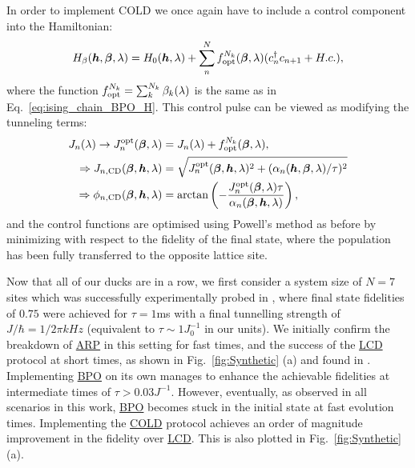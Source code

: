 \documentclass[a4paper,oneside,11pt]{book}
\newcommand{\betabb}{\boldsymbol{\beta}}
\newcommand{\hbb}{\boldsymbol{h}}
\newcommand{\acrref}[1]{\hyperref[acr:#1]{#1}}
\begin{document}
In order to implement COLD we once again have to include a control component into the Hamiltonian:
\begin{equation}\label{eq:ising_control_nocrab}
    \begin{aligned}
        H_{\beta}(\hbb, \betabb, \lambda) = H_0(\hbb, \lambda) + \sum_n^N f_{\rm opt}^{N_k}(\betabb, \lambda) (c_n^{\dag}c_{n+1} + H.c.),
    \end{aligned}
\end{equation}
where the function $f_{\rm opt}^{N_k} = \sum_k^{N_k} \beta_k(\lambda)$ is the same as in Eq.~\eqref{eq:ising_chain_BPO_H}. This control pulse can be viewed as modifying the tunneling terms:
\begin{equation}\label{eq:synthetic_control_funcs}
    \begin{aligned}
        J_n(\lambda) \rightarrow J_n^{\rm opt}(\betabb, \lambda) &= J_n(\lambda) + f_{\rm opt}^{N_k}(\betabb, \lambda), \\
        \Rightarrow J_{n, \rm CD}(\betabb, \hbb, \lambda) &= \sqrt{J_n^{\rm opt}(\betabb,\hbb, \lambda)^2 + (\alpha_n(\hbb, \betabb, \lambda)/\tau)^2} \\
        \Rightarrow \phi_{n, \mathrm{CD}}(\betabb, \hbb, \lambda) &= \arctan\left(-\frac{J_n^{\rm opt}(\betabb, \lambda)\tau}{\alpha_n(\betabb, \hbb, \lambda)}\right),
    \end{aligned}
\end{equation} 
and the control functions are optimised using Powell's method as before by minimizing with respect to the fidelity of the final state, where the population has been fully transferred to the opposite lattice site. 

Now that all of our ducks are in a row, we first consider a system size of $N=7$ sites which was successfully experimentally probed in \cite{meier_counterdiabatic_2020}, where final state fidelities of $0.75$ were achieved for $\tau = 1$ms with a final tunnelling strength of $J/\hbar = 1/2\pi kHz$ (equivalent to $\tau \sim 1 J_0^{-1}$ in our units). We initially confirm the breakdown of \acrref{ARP} in this setting for fast times, and the success of the \acrref{LCD} protocol at short times, as shown in Fig.~\ref{fig:Synthetic} (a) and found in \cite{meier_counterdiabatic_2020}. Implementing \acrref{BPO} on its own manages to enhance the achievable fidelities at intermediate times of $\tau > 0.03 J^{-1}$. However, eventually, as observed in all scenarios in this work, \acrref{BPO} becomes stuck in the initial state at fast evolution times. Implementing the \acrref{COLD} protocol achieves an order of magnitude improvement in the fidelity over \acrref{LCD}. This is also plotted in Fig.~\ref{fig:Synthetic}(a).
\end{document}
